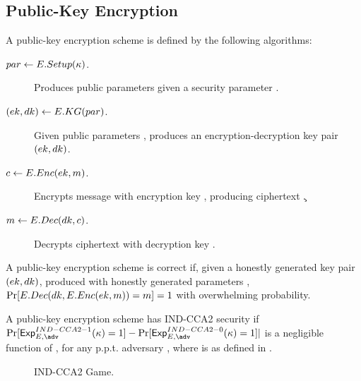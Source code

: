 \subsection{Public-Key Encryption}
\label{sapp:pk-encryption}

A public-key encryption scheme is defined by the following algorithms:

\begin{description}
\item[$par \gets E.Setup(\kappa)$.] Produces public parameters \parm given
  a security parameter \secpar.
\item[$(ek,dk) \gets E.KG(par)$.] Given public parameters \parm,
  produces an encryption-decryption key pair $(ek,dk)$.
\item[$c \gets E.Enc(ek,m)$.] Encrypts message \msg with encryption key
  \ek, producing ciphertext \c.
\item[$m \gets E.Dec(dk,c)$.] Decrypts ciphertext \Ec with decryption key
  \dk.
\end{description}

A public-key encryption scheme is correct if, given a honestly generated key
pair $(ek,dk)$, produced with honestly generated parameters \Eparm,
$\Pr[E.Dec(dk,E.Enc(ek,m))=m] = 1$ with overwhelming probability.

A public-key encryption scheme has IND-CCA2 security if
$\Pr[\ExpINDCCAiio(\secpar) = 1] - \Pr[\ExpINDCCAiiz(\secpar) = 1]|$ is
a negligible function of \Esecpar, for any p.p.t. adversary \adv, where
\ExpINDCCAiib is as defined in .

\begin{figure}[ht!]
  \label{fig:indcca2-game}
  \caption{IND-CCA2 Game.}
\end{figure}

